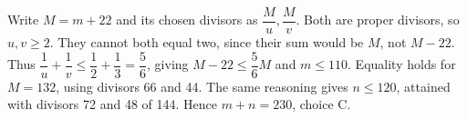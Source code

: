 Write $M=m+22$ and its chosen divisors as $\dfrac{M}{u},\dfrac{M}{v}$. Both are proper divisors, so $u,v\ge2$. They cannot both equal two, since their sum would be $M$, not $M-22$. Thus $\dfrac{1}{u}+\dfrac{1}{v}\le\dfrac{1}{2}+\dfrac{1}{3}=\dfrac{5}{6}$, giving $M-22\le\dfrac{5}{6}M$ and $m\le110$. Equality holds for $M=132$, using divisors 66 and 44. The same reasoning gives $n\le120$, attained with divisors 72 and 48 of 144. Hence $\boxed{m+n=230}$, choice C.
